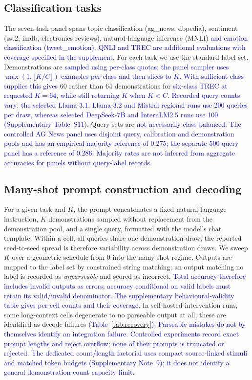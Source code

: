 \documentclass[pdflatex, sn-nature]{sn-jnl}%
\theoremstyle{thmstyleone}%
\theoremstyle{thmstyletwo}%
\theoremstyle{thmstylethree}%
\begin{document}
\subsection{Classification tasks}
The seven-task panel spans topic classification (ag\_news, dbpedia), sentiment
(sst2, imdb, electronics reviews), natural-language inference (MNLI) \textcolor{blue}{and emotion
classification (tweet\_}\textcolor{blue}{emotion). QNLI and TREC are additional evaluations with
coverage specified in the supplement}. For each task we use the standard label set.
Demonstrations are \textcolor{blue}{sampled using per-class quotas; the panel sampler uses
$\max(1,\lfloor K/C\rfloor)$ examples per class and then slices to $K$. With sufficient
class supplies this gives} 60 rather than 64 demonstrations for \textcolor{blue}{six-class TREC at
requested $K{=}64$, while still returning $K$ when $K<C$. Recorded query counts vary:
the selected Llama-3.1, Llama-3.2 and Mistral regional runs use 200 queries per draw,
whereas selected DeepSeek-7B and InternLM2.5 runs use 100
(Supplementary Table}~\textcolor{blue}{S11}). Query sets are \textcolor{blue}{not necessarily class-balanced.
The controlled AG News panel uses disjoint query, calibration and demonstration
pools and has an empirical-majority reference of $0.275$; the separate 500-query
panel has a reference of $0.286$. Majority rates are not inferred from aggregate
accuracies for panels without query-label records.}

\subsection{Many-shot prompt construction and decoding}
For a given task and $K$, the prompt concatenates a fixed natural-language
instruction, $K$ demonstrations sampled without replacement from the demonstration
pool, and a single query, formatted with the model's chat template. Within a cell, all
queries share one demonstration draw; the reported seed-to-seed spread is therefore
variability across demonstration draws. We sweep $K$ over a geometric schedule from
$0$ into the many-shot regime. Outputs are mapped to the label set by constrained
string matching; an output matching no label is recorded as \emph{unparseable} and
scored as incorrect\textcolor{blue}{. Total accuracy therefore includes invalid outputs as errors;
accuracy conditional on valid labels must retain its valid/invalid denominator. The supplementary behavioural-validity table gives per-cell counts and their coverage}.
In self-hosted intervention runs, some long-context cells degenerate to no parseable
output at all; these are identified as decode failures \textcolor{blue}{(Table}~\textcolor{blue}{\ref{tab:recovery}}\textcolor{blue}{).
Parseable mistakes do not by themselves identify an integration failure. Controlled experiments record exact prompt lengths and reject overflow; none of
their prompts is truncated or rejected. The dedicated count/length factorial uses compact source-linked stimuli and matched token budgets (Supplementary Note~9); it does not identify a general demonstration-count capacity limit.}
\end{document}
